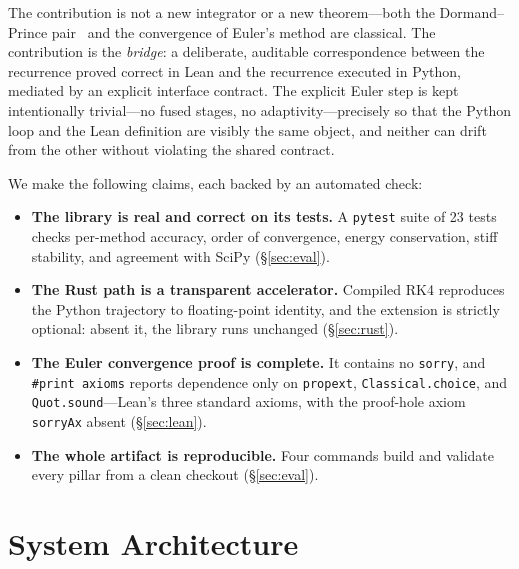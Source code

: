 \documentclass[sigplan,nonacm,screen,review]{acmart}
\begin{document}
The contribution is not a new integrator or a new theorem---both the
Dormand--Prince pair~\cite{dormandprince1980} and the convergence of Euler's
method are classical. The contribution is the \emph{bridge}: a deliberate,
auditable correspondence between the recurrence proved correct in Lean and the
recurrence executed in Python, mediated by an explicit interface contract. The
explicit Euler step is kept intentionally trivial---no fused stages, no
adaptivity---precisely so that the Python loop and the Lean definition are
visibly the same object, and neither can drift from the other without violating
the shared contract.

We make the following claims, each backed by an automated check:
\begin{itemize}
\item \textbf{The library is real and correct on its tests.} A \texttt{pytest}
suite of 23 tests checks per-method accuracy, order of convergence, energy
conservation, stiff stability, and agreement with SciPy
(\S\ref{sec:eval}).
\item \textbf{The Rust path is a transparent accelerator.} Compiled RK4
reproduces the Python trajectory to floating-point identity, and the extension
is strictly optional: absent it, the library runs unchanged
(\S\ref{sec:rust}).
\item \textbf{The Euler convergence proof is complete.} It contains no
\texttt{sorry}, and \texttt{\#print axioms} reports dependence only on
\texttt{propext}, \texttt{Classical.choice}, and \texttt{Quot.sound}---Lean's
three standard axioms, with the proof-hole axiom \texttt{sorryAx} absent
(\S\ref{sec:lean}).
\item \textbf{The whole artifact is reproducible.} Four commands build and
validate every pillar from a clean checkout (\S\ref{sec:eval}).
\end{itemize}

\section{System Architecture}
\label{sec:arch}
\end{document}
